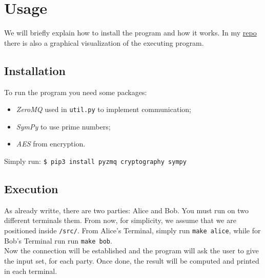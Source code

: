 \documentclass[12pt]{article}
\newcommand{\inlinecode}{\texttt}
\begin{document}
\section{Usage}
We will briefly explain how to install the program and how it works. In my \hyperref[zanoGit]{repo} there is also a graphical visualization of the executing program. 
\subsection{Installation}
To run the program you need some packages:
\begin{itemize}
    \item \textit{ZeroMQ} used in \inlinecode{util.py} to implement communication;
    \item \textit{SymPy} to use prime numbers;
    \item \textit{AES} from encryption.
\end{itemize}
Simply run: 
\inlinecode{\$ pip3 install pyzmq cryptography sympy}
\subsection{Execution}
As already writte, there are two parties: Alice and Bob. You must run on two different terminals them. From now, for simplicity, we assume that we are positioned inside \inlinecode{/src/}.
From Alice's Terminal, simply run \inlinecode{make alice}, while for Bob's Terminal run run \inlinecode{make bob}.\\
Now the connection will be established and the program will ask the user to give the input set, for each party. Once done, the result will be computed and printed in each terminal.
\end{document}

